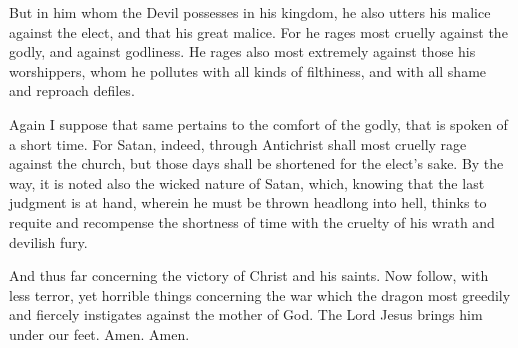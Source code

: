But in him whom the Devil possesses in his kingdom, he also utters his malice against the elect, and that his great malice. For he rages most cruelly against the godly, and against godliness. He rages also most extremely against those his worshippers, whom he pollutes with all kinds of filthiness, and with all shame and reproach defiles.

Again I suppose that same pertains to the comfort of the godly, that is spoken of a short time. For Satan, indeed, through Antichrist shall most cruelly rage against the church, but those days shall be shortened for the elect’s sake. By the way, it is noted also the wicked nature of Satan, which, knowing that the last judgment is at hand, wherein he must be thrown headlong into hell, thinks to requite and recompense the shortness of time with the cruelty of his wrath and devilish fury.

And thus far concerning the victory of Christ and his saints. Now follow, with less terror, yet horrible things concerning the war which the dragon most greedily and fiercely instigates against the mother of God. The Lord Jesus brings him under our feet. Amen. Amen.

